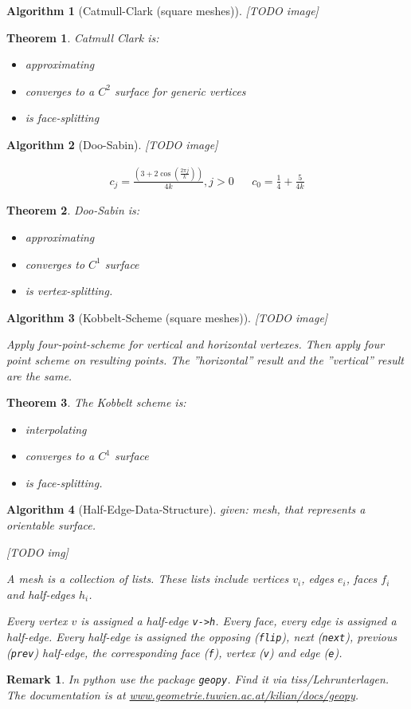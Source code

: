 \documentclass[]{article}
\newtheorem{theorem}{Theorem}
\newtheorem{algorithm}{Algorithm}
\newtheorem{remark}{Remark}
\begin{document}
\begin{algorithm}[Catmull-Clark (square meshes)]
	[TODO image]
\end{algorithm}

\begin{theorem}
	Catmull Clark is:
	\begin{itemize}
		\item approximating
		\item converges to a $C^2$ surface for generic vertices
		\item is face-splitting
	\end{itemize}
\end{theorem}

\begin{algorithm}[Doo-Sabin]
	[TODO image]
	
	\begin{align*}
		c_j = \frac{\left(3+2\cos\left(\frac{2\pi j}{k}\right)\right)}{4k}, j > 0 && c_0 = \frac{1}{4} + \frac{5}{4k}
	\end{align*}
\end{algorithm}

\begin{theorem}
	Doo-Sabin is:
	\begin{itemize}
		\item approximating
		\item converges to $C^1$ surface
		\item is vertex-splitting.
	\end{itemize}
\end{theorem}

\begin{algorithm}[Kobbelt-Scheme (square meshes)]
	[TODO image]
	
	Apply four-point-scheme for vertical and horizontal vertexes. Then apply four point scheme on resulting points. The ''horizontal'' result and the ''vertical'' result are the same.
\end{algorithm}

\begin{theorem}
	The Kobbelt scheme is:
	\begin{itemize}
		\item interpolating
		\item converges to a $C^1$ surface
		\item is face-splitting.
	\end{itemize}
\end{theorem}

\begin{algorithm}[Half-Edge-Data-Structure]
	given: mesh, that represents a orientable surface.
	
	[TODO img]
	
	A mesh is a collection of lists. These lists include vertices $v_i$, edges $e_i$, faces $f_i$ and half-edges $h_i$.
	
	Every vertex $v$ is assigned a half-edge \texttt{v->h}. Every face, every edge is assigned a half-edge. Every half-edge is assigned the opposing (\texttt{flip}), next (\texttt{next}), previous (\texttt{prev}) half-edge, the corresponding face (\texttt{f}), vertex (\texttt{v}) and edge (\texttt{e}).
\end{algorithm}

\begin{remark}
	In python use the package \texttt{geopy}. Find it via tiss/Lehrunterlagen. The documentation is at \url{www.geometrie.tuwien.ac.at/kilian/docs/geopy}.
\end{remark}
\end{document}
